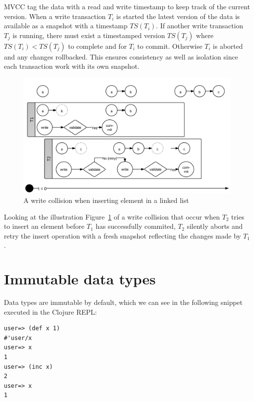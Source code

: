 \documentclass[a4paper,12pt]{kth-mag}
\begin{document}
MVCC tag the data with a read and write timestamp to keep track of the current version. When a write transaction $T_i$ is started the latest version of the data is available as a snapshot with a timestamp $TS(T_i)$. If another write transaction $T_j$ is running, there must exist a timestamped version $TS(T_j)$ where $TS(T_i) \lt TS(T_j)$ to complete and for $T_i$ to commit. Otherwise $T_i$ is aborted and any changes rollbacked. This ensures consistency as well as isolation since each transaction work with its own snapshot.

\begin{figure}[H]
\centering
\includegraphics[scale=0.8]{images/TransactionWriteCollision.png}
\caption{A write collision when inserting element in a linked list}
\label{fig:twc}
\end{figure}

Looking at the illustration Figure~\ref{fig:twc} of a write collision that occur when $T_2$ tries to insert an element before $T_1$ has successfully commited, $T_2$ silently aborts and retry the insert operation with a fresh snapshot reflecting the changes made by $T_1$.

\section{Immutable data types}

Data types are immutable by default, which we can see in the following snippet executed in the Clojure REPL:

\begin{listing}[H]
	\begin{verbatim}
user=> (def x 1)
#'user/x
user=> x
1
user=> (inc x)
2
user=> x
1
	\end{verbatim}
\end{listing}
\end{document}
